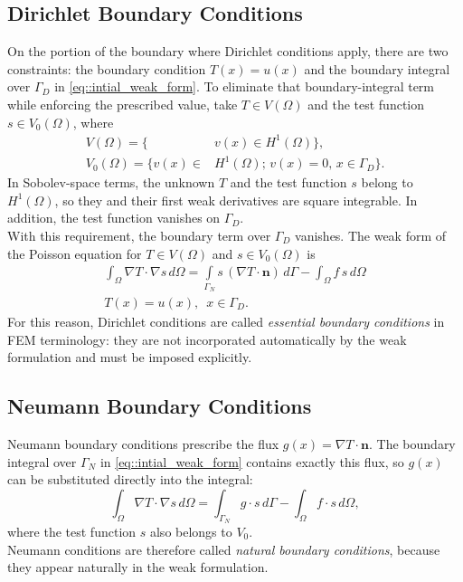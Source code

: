 \documentclass[a4paper]{article}
\begin{document}
\subsection{Dirichlet Boundary Conditions}
On the portion of the boundary where Dirichlet conditions apply, there are two constraints: the boundary condition $T(x)=u(x)$ and the boundary integral over $\Gamma_D$ in \ref{eq::intial_weak_form}. To eliminate that boundary-integral term while enforcing the prescribed value, take $T\in V(\Omega)$ and the test function $s\in V_0(\Omega)$, where
\begin{equation*}
\begin{aligned}
V(\Omega)=\{ &v(x)\in H^1(\Omega)\},\\
V_0(\Omega)=\{v(x) \in& H^1(\Omega);\, v(x)=0,\, x\in\Gamma_D\}.
\end{aligned}
\end{equation*}
In Sobolev-space terms, the unknown $T$ and the test function $s$ belong to $H^1(\Omega)$, so they and their first weak derivatives are square integrable. In addition, the test function vanishes on $\Gamma_D$.\\
With this requirement, the boundary term over $\Gamma_D$ vanishes. The weak form of the Poisson equation for $T\in V(\Omega)$ and $s\in V_0(\Omega)$ is
\begin{equation}
\begin{aligned}
\int_{\Omega}\nabla T\cdot\nabla s\,d\Omega = \int\limits_{\Gamma_N} s\,(\nabla T\cdot\mathbf{n})\,d\Gamma-\int_{\Omega}f\,s\,d\Omega\\
T(x)=u(x),\,\,\, x\in \Gamma_D.
\end{aligned}
\end{equation}
For this reason, Dirichlet conditions are called \textit{essential boundary conditions} in FEM terminology: they are not incorporated automatically by the weak formulation and must be imposed explicitly.
\subsection{Neumann Boundary Conditions}
Neumann boundary conditions prescribe the flux $g(x)=\nabla T\cdot\mathbf{n}$. The boundary integral over $\Gamma_N$ in \ref{eq::intial_weak_form} contains exactly this flux, so $g(x)$ can be substituted directly into the integral:
\begin{equation}
\int_{\Omega} \nabla T\cdot \nabla s \, d\Omega= \int_{\Gamma_N}g\cdot s \, d\Gamma-\int_{\Omega}f\cdot s\,d\Omega,
\end{equation}
where the test function $s$ also belongs to $V_0$.\\
Neumann conditions are therefore called \textit{natural boundary conditions}, because they appear naturally in the weak formulation.
\end{document}
